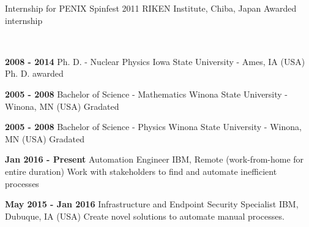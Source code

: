 \begin{paracol}{2}
\begin{leftcolumn}
\cvmetaevent
{Internship for PENIX Spinfest 2011}
{RIKEN Institute, Chiba, Japan}
{}
{Awarded internship}

\end{leftcolumn}
\begin{rightcolumn}
 \\[14pt]
\vspace{-12pt}

{}

\cvevent
	{\textbf{2008 - 2014}}
	{Ph. D. - Nuclear Physics}
	{Iowa State University - Ames, IA (USA)}
	{Ph. D. awarded}
\vfill\null

\cvevent
	{\textbf{2005 - 2008}}
	{Bachelor of Science - Mathematics}
	{Winona State University - Winona, MN (USA)}
	{Gradated}
\vfill\null

\cvevent
	{\textbf{2005 - 2008}}
	{Bachelor of Science - Physics}
	{Winona State University - Winona, MN (USA)}
	{Gradated}
\vfill\null

\vfill\null
{}

\cvevent
	{\textbf{Jan 2016 - Present}}
	{Automation Engineer}
	{IBM, Remote (work-from-home for entire duration)}
	{Work with stakeholders to find and automate inefficient processes}
	{}
\vfill\null

\cvevent
	{\textbf{May 2015 - Jan 2016}}
	{Infrastructure and Endpoint Security Specialist}
	{IBM, Dubuque, IA (USA)}
	{Create novel solutions to automate manual processes.}
	{}
\vfill\null
\vspace{-0.5cm}
\vfill\null
{}


\end{rightcolumn}
\end{paracol}
